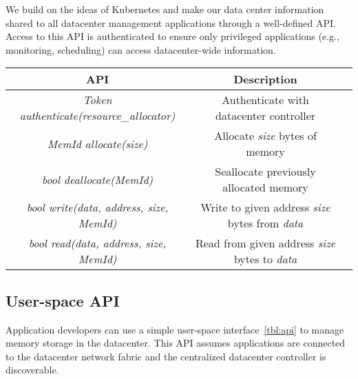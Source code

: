 We build on the ideas of Kubernetes and make our data center information shared to all datacenter management applications through a well-defined API. Access to this API is authenticated to ensure only privileged applications (e.g., monitoring, scheduling) can access datacenter-wide information.

\begin{table*}[t!]
\centering
\begin{tabular}{c|c|c}
  API & Description \\
  \hline \hline
  \emph{Token authenticate(resource\_allocator)} & Authenticate with datacenter controller \\
  \emph{MemId allocate(size)} & Allocate \emph{size} bytes of memory \\
  \emph{bool deallocate(MemId)} & Seallocate previously allocated memory \\
  \emph{bool write(data, address, size, MemId)} & Write to given address \emph{size} bytes from \emph{data} \\
  \emph{bool read(data, address, size, MemId)} & Read from given address \emph{size} bytes to \emph{data} \\
\end{tabular}
\caption{\System's user-space API} 
\label{tbl:api}
\end{table*}


\subsection{User-space API}

Application developers can use a simple user-space interface~\ref{tbl:api} to manage memory storage in the datacenter. This API assumes applications are connected to the datacenter network fabric and the centralized datacenter controller is discoverable.
